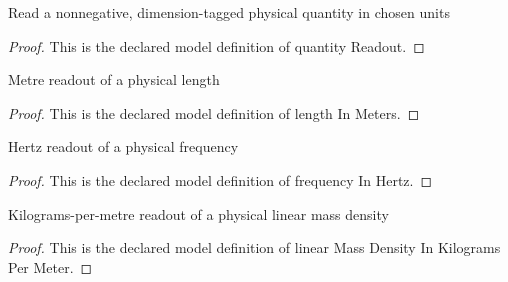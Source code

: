 \begin{definition}
  \label{def:physics:phyx-mini-0295:phyxminiproblems-problemphyxmini0295-quantityreadout}
  Read a nonnegative, dimension-tagged physical quantity in chosen units
\end{definition}
\begin{proof}
  This is the declared model definition of quantity Readout.
\end{proof}
\begin{definition}
  \label{def:physics:phyx-mini-0295:phyxminiproblems-problemphyxmini0295-lengthinmeters}
  Metre readout of a physical length
\end{definition}
\begin{proof}
  This is the declared model definition of length In Meters.
\end{proof}
\begin{definition}
  \label{def:physics:phyx-mini-0295:phyxminiproblems-problemphyxmini0295-frequencyinhertz}
  Hertz readout of a physical frequency
\end{definition}
\begin{proof}
  This is the declared model definition of frequency In Hertz.
\end{proof}
\begin{definition}
  \label{def:physics:phyx-mini-0295:phyxminiproblems-problemphyxmini0295-linearmassdensityinkilogramspermeter}
  Kilograms-per-metre readout of a physical linear mass density
\end{definition}
\begin{proof}
  This is the declared model definition of linear Mass Density In Kilograms Per Meter.
\end{proof}
